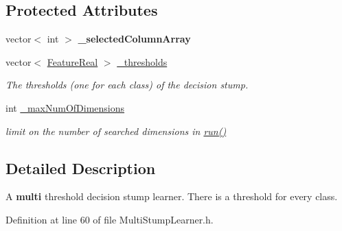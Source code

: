 \subsection*{Protected Attributes}
\begin{DoxyCompactItemize}
\item 
\hypertarget{classMultiBoost_1_1MultiStumpLearner_adf516324abf54cc94bed0c1be974e416}{
vector$<$ int $>$ {\bfseries \_\-selectedColumnArray}}
\label{classMultiBoost_1_1MultiStumpLearner_adf516324abf54cc94bed0c1be974e416}

\item 
\hypertarget{classMultiBoost_1_1MultiStumpLearner_aad761ccec4f51efa49261dc83d0c404f}{
vector$<$ \hyperlink{Defaults_8h_a3a11cfe6a5d469d921716ca6291e934f}{FeatureReal} $>$ \hyperlink{classMultiBoost_1_1MultiStumpLearner_aad761ccec4f51efa49261dc83d0c404f}{\_\-thresholds}}
\label{classMultiBoost_1_1MultiStumpLearner_aad761ccec4f51efa49261dc83d0c404f}

\begin{DoxyCompactList}\small\item\em The thresholds (one for each class) of the decision stump. \end{DoxyCompactList}\item 
\hypertarget{classMultiBoost_1_1MultiStumpLearner_a4091d825332ef577f2b2a64cf8feee82}{
int \hyperlink{classMultiBoost_1_1MultiStumpLearner_a4091d825332ef577f2b2a64cf8feee82}{\_\-maxNumOfDimensions}}
\label{classMultiBoost_1_1MultiStumpLearner_a4091d825332ef577f2b2a64cf8feee82}

\begin{DoxyCompactList}\small\item\em limit on the number of searched dimensions in \hyperlink{classMultiBoost_1_1MultiStumpLearner_a682f5428b73db0e89de8128539108f6b}{run()} \end{DoxyCompactList}\end{DoxyCompactItemize}


\subsection{Detailed Description}
A {\bfseries multi} threshold decision stump learner. There is a threshold for every class. 

Definition at line 60 of file MultiStumpLearner.h.



